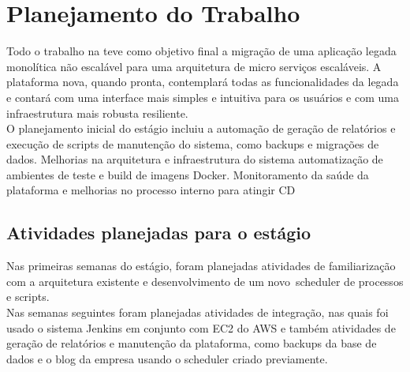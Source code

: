 \chapter{Planejamento do Trabalho}\label{chap:atividadesPlanejadas}

Todo o trabalho na \nomeEmpresa teve como objetivo final a migração de uma aplicação legada monolítica não escalável para uma arquitetura de micro serviços escaláveis. A plataforma nova, quando pronta, contemplará todas as funcionalidades da legada e contará com uma interface mais simples e intuitiva para os usuários e com uma infraestrutura mais robusta resiliente. \\

O planejamento inicial do estágio incluiu a automação de geração de relatórios e execução de scripts de manutenção do sistema, como backups e migrações de dados. Melhorias na arquitetura e infraestrutura do sistema automatização de ambientes de teste e build de imagens \gls{Docker}. Monitoramento da saúde da plataforma e melhorias no processo interno para atingir \gls{CD}\\


\section{Atividades planejadas para o estágio}



Nas primeiras semanas do estágio, foram planejadas atividades de familiarização com a arquitetura existente e desenvolvimento de um novo~\gls{scheduler} de processos e scripts.\\

Nas semanas seguintes foram planejadas atividades de integração, nas quais foi usado o sistema \gls{Jenkins} em conjunto com \gls{EC2} do \gls{AWS} e também atividades de geração de relatórios e manutenção da plataforma, como backups da base de dados e o blog da empresa usando o \gls{scheduler} criado previamente.

